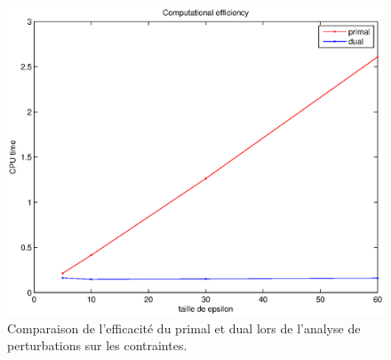 \begin{figure}
  \begin{center}
    \includegraphics[scale=0.6]{img/efficiencyDual.eps}
    \caption{Comparaison de l'efficacité du primal et dual lors de
    l'analyse de perturbations sur les contraintes.}
    \label{fig:efficiencyDual}
  \end{center}
\end{figure}
